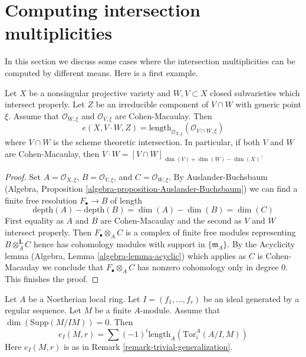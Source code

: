 \section{Computing intersection multiplicities}
\label{section-computing-intersection-multiplicities}

\noindent
In this section we discuss some cases where the intersection multiplicities
can be computed by different means. Here is a first example.

\begin{lemma}
\label{lemma-intersection-multiplicity-CM}
Let $X$ be a nonsingular projective variety and $W, V \subset X$ closed
subvarieties which intersect properly. Let $Z$ be an irreducible component
of $V \cap W$ with generic point $\xi$. Assume that $\mathcal{O}_{W, \xi}$
and $\mathcal{O}_{V, \xi}$ are Cohen-Macaulay. Then
$$
e(X, V \cdot W, Z) =
\text{length}_{\mathcal{O}_{X, \xi}}(\mathcal{O}_{V \cap W, \xi})
$$
where $V \cap W$ is the scheme theoretic intersection.
In particular, if both $V$ and $W$ are Cohen-Macaulay, then
$V \cdot W = [V \cap W]_{\dim(V) + \dim(W) - \dim(X)}$.
\end{lemma}

\begin{proof}
Set $A = \mathcal{O}_{X, \xi}$, $B = \mathcal{O}_{V, \xi}$, and
$C = \mathcal{O}_{W, \xi}$. By Auslander-Buchsbaum
(Algebra, Proposition \ref{algebra-proposition-Auslander-Buchsbaum})
we can find a finite free resolution $F_\bullet \to B$ of
length
$$
\text{depth}(A) - \text{depth}(B) =
\dim(A) - \dim(B) = \dim(C)
$$
First equality as $A$ and $B$ are Cohen-Macaulay and the second
as $V$ and $W$ intersect properly. Then $F_\bullet \otimes_A C$ is a
complex of finite free modules representing $B \otimes_A^\mathbf{L} C$
hence has cohomology modules with support in $\{\mathfrak m_A\}$.
By the Acyclicity lemma (Algebra, Lemma \ref{algebra-lemma-acyclic})
which applies as $C$ is Cohen-Macaulay
we conclude that $F_\bullet \otimes_A C$ has nonzero
cohomology only in degree $0$. This finishes the proof.
\end{proof}

\begin{lemma}
\label{lemma-one-ideal-ci}
Let $A$ be a Noetherian local ring. Let $I = (f_1, \dots, f_r)$ be an ideal
generated by a regular sequence. Let $M$ be a finite $A$-module. Assume that
$\dim(\text{Supp}(M/IM)) = 0$. Then
$$
e_I(M, r) = \sum (-1)^i\text{length}_A(\text{Tor}_i^A(A/I, M))
$$
Here $e_I(M, r)$ is as in Remark \ref{remark-trivial-generalization}.
\end{lemma}

